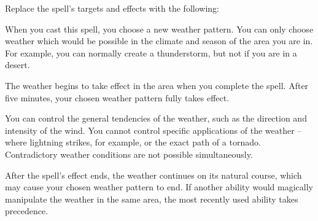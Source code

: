 Replace the spell's targets and effects with the following:
\begin{spellcontent}

\begin{augmenttargetinginfo}



\end{augmenttargetinginfo}


\begin{augmenteffects}



\spelleffect
When you cast this spell, you choose a new weather pattern.
You can only choose weather which would be possible in the climate and season of the area you are in.
For example, you can normally create a thunderstorm, but not if you are in a desert.

The weather begins to take effect in the area when you complete the spell.
After five minutes, your chosen weather pattern fully takes effect.

You can control the general tendencies of the weather, such as the direction and intensity of the wind.
You cannot control specific applications of the weather -- where lightning strikes, for example, or the exact path of a tornado.
Contradictory weather conditions are not possible simultaneously.

After the spell's effect ends, the weather continues on its natural course, which may cause your chosen weather pattern to end.
If another ability would magically manipulate the weather in the same area, the most recently used ability takes precedence.








\end{augmenteffects}

\end{spellcontent}




